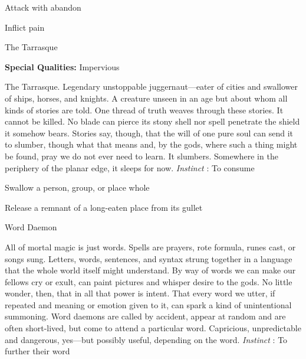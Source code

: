\startitemize[1,packed]
         
\item Attack with abandon

         
\item Inflict pain

       
\stopitemize
       
\startMonsterName
The Tarrasque	 
\stopMonsterName
       
\startMonsterQualities
         {\bf Special Qualities:}  Impervious
\stopMonsterQualities
       
\startMonsterDescription
The Tarrasque. Legendary unstoppable juggernaut—eater of cities and swallower of ships, horses, and knights. A creature unseen in an age but about whom all kinds of stories are told. One thread of truth weaves through these stories. It cannot be killed. No blade can pierce its stony shell nor spell penetrate the shield it somehow bears. Stories say, though, that the will of one pure soul can send it to slumber, though what that means and, by the gods, where such a thing might be found, pray we do not ever need to learn. It slumbers. Somewhere in the periphery of the planar edge, it sleeps for now. {\em Instinct} : To consume
\stopMonsterDescription
       
\startitemize[1,packed]
         
\item Swallow a person, group, or place whole

         
\item Release a remnant of a long-eaten place from its gullet

       
\stopitemize
       
\startMonsterName
Word Daemon	 
\stopMonsterName
       
\startMonsterDescription
All of mortal magic is just words. Spells are prayers, rote formula, runes cast, or songs sung. Letters, words, sentences, and syntax strung together in a language that the whole world itself might understand. By way of words we can make our fellows cry or exult, can paint pictures and whisper desire to the gods. No little wonder, then, that in all that power is intent. That every word we utter, if repeated and meaning or emotion given to it, can spark a kind of unintentional summoning. Word daemons are called by accident, appear at random and are often short-lived, but come to attend a particular word. Capricious, unpredictable and dangerous, yes—but possibly useful, depending on the word. {\em Instinct} : To further their word
\stopMonsterDescription
       
